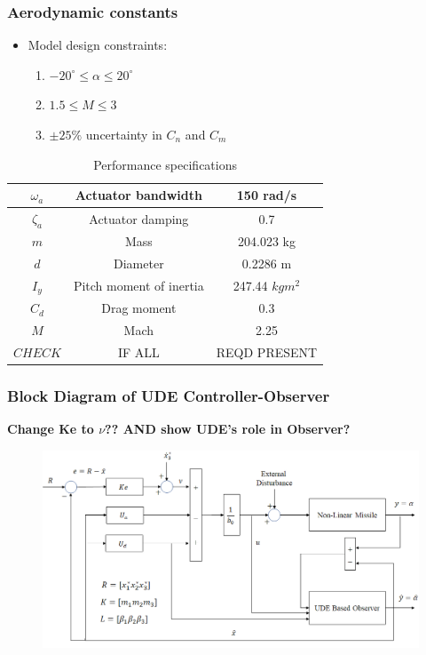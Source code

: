 \documentclass[table,10pt,red]{beamer}	%
\begin{document}
 	
 	\begin{frame}
 	\frametitle{Aerodynamic constants}
 	\begin{itemize}
 		\item Model design constraints:
 		\begin{enumerate}
 			\item $-20^\circ\le \alpha \le20^\circ$
 			\item $1.5 \le M \le 3$
 			\item $\pm25\%$ uncertainty in $C_n$ and $C_m$
 		\end{enumerate}
 	\end{itemize}
 	\begin{table}[h]
 		\begin{center}
 			\caption{Performance specifications}\label{tb1}
 			\begin{tabular}{ccc}
 				\hline
 				$\omega_a$ & Actuator bandwidth & 150 rad/s\\ \hline
 				$\zeta_a$ & Actuator damping & 0.7 \\ \hline
 				$m$ & Mass & 204.023 kg\\ \hline
 				$d$ & Diameter & 0.2286 m \\ \hline
 				$I_y$ & Pitch moment of inertia & 247.44 $kgm^2$\\ \hline
 				$C_d$ & Drag moment & 0.3\\ \hline
 				$M$ & Mach & 2.25 \\ \hline
 				$CHECK$ & IF ALL & REQD PRESENT \\ \hline
 		
 			\end{tabular}
 		\end{center}
 	\end{table}
 \end{frame}
 	
	\begin{frame}
	\frametitle{Block Diagram of UDE Controller-Observer}
		\textbf{Change Ke to $\nu$?? AND show UDE's role in Observer?}
		\begin{figure}
			\includegraphics[width=0.8\linewidth]{block_diag}
		\end{figure}

\end{frame}
\end{document}
